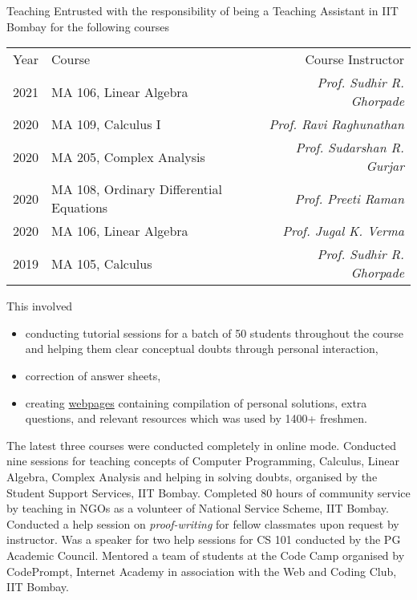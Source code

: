 
\begin{rubric}{Teaching}
	\entry*[2019-2021] Entrusted with the responsibility of being a Teaching Assistant in IIT Bombay for the following courses 

	\begin{tabular}{@{}llr}
		Year & Course & Course Instructor\\
		2021 & MA 106, Linear Algebra& \emph{Prof. Sudhir R. Ghorpade}\\
		2020 & MA 109, Calculus I & \emph{Prof. Ravi Raghunathan}\\
		2020 & MA 205, Complex Analysis & \emph{Prof. Sudarshan R. Gurjar}\\
		2020 & MA 108, Ordinary Differential Equations & \emph{Prof. Preeti Raman}\\
		2020 & MA 106, Linear Algebra & \emph{Prof. Jugal K. Verma}\\
       	2019 & MA 105, Calculus & \hphantom{hello}\emph{Prof. Sudhir R. Ghorpade}
    \end{tabular}

	This involved
		\vspace{-3mm}
	\begin{itemize}%
		\setlength\itemsep{-0.4em}
		\item conducting tutorial sessions for a batch of 50 students throughout the course and helping them clear conceptual doubts through personal interaction,
		\item correction of answer sheets,
		\item creating \href{http://aryamanmaithani.github.io/tuts/}{webpages} containing compilation of personal solutions, extra questions, and relevant resources which was used by 1400+ freshmen. \vspace{-2mm}
	\end{itemize}
	The latest three courses were conducted completely in online mode.
	\entry*[2020] Conducted nine sessions for teaching concepts of Computer Programming, Calculus, Linear Algebra, Complex Analysis and helping in solving doubts, organised by the Student Support Services, IIT Bombay. 
	\entry*[2019] Completed 80 hours of community service by teaching in NGOs as a volunteer of National Service Scheme, IIT Bombay.
	\entry*[2018] Conducted a help session on \emph{proof-writing} for fellow classmates upon request by instructor.
	\entry*[2018] Was a speaker for two help sessions for CS 101 conducted by the PG Academic Council.
	\entry*[2018] Mentored a team of students at the Code Camp organised by CodePrompt, Internet Academy in association with the Web and Coding Club, IIT Bombay.
\end{rubric}

